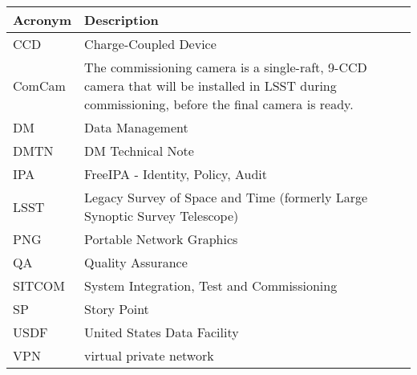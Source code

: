 \addtocounter{table}{-1}
\begin{longtable}{p{}p{}}\hline
\textbf{Acronym} & \textbf{Description}  \\\hline

CCD & Charge-Coupled Device \\\hline
ComCam & The commissioning camera is a single-raft, 9-CCD camera that will be installed in LSST during commissioning, before the final camera is ready. \\\hline
DM & Data Management \\\hline
DMTN & DM Technical Note \\\hline
IPA & FreeIPA - Identity, Policy, Audit \\\hline
LSST & Legacy Survey of Space and Time (formerly Large Synoptic Survey Telescope) \\\hline
PNG & Portable Network Graphics \\\hline
QA & Quality Assurance \\\hline
SITCOM & System Integration, Test and Commissioning \\\hline
SP & Story Point \\\hline
USDF & United States Data Facility \\\hline
VPN & virtual private network \\\hline
\end{longtable}

